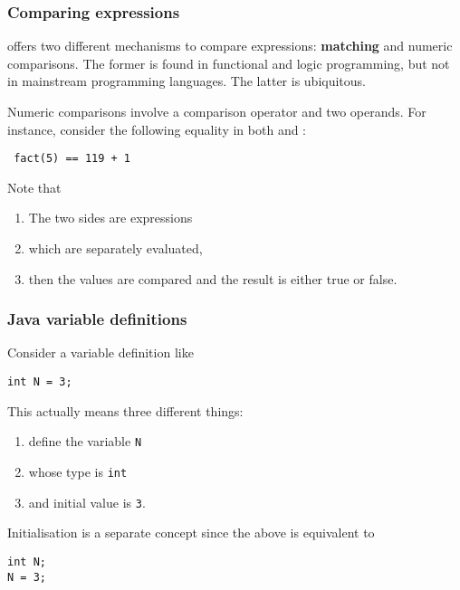 
%
\begin{frame}
\frametitle{Comparing expressions}

\Erlang offers two different mechanisms to compare expressions:
\textbf{matching} and numeric comparisons. The former is found in
functional and logic programming, but not in mainstream programming
languages. The latter is ubiquitous.

\bigskip

Numeric comparisons involve a comparison operator and two
operands. For instance, consider the following equality in both \Java
and \Erlang:
\begin{center}
\tt
fact(5) == 119 + 1
\end{center}
Note that
\begin{enumerate}

  \item The two sides are expressions

  \item which are separately evaluated, 

  \item then the values are compared and the result is either true or
    false.

\end{enumerate}

\end{frame}

%
\begin{frame}[containsverbatim]
\frametitle{Java variable definitions}

Consider a \Java variable definition like
\begin{verbatim}
int N = 3;
\end{verbatim}
This actually means three different things:
\begin{enumerate}

  \item define the variable \texttt{N}

  \item whose type is \texttt{int}

  \item and initial value is \texttt{3}.

\end{enumerate}
Initialisation is a separate concept since the above is equivalent to
\begin{verbatim}
int N;
N = 3;
\end{verbatim}

\end{frame}

